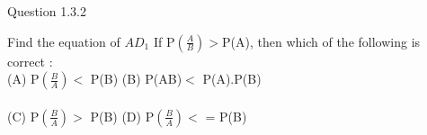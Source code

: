 \documentclass[journal,12pt,twocolumn]{IEEEtran}
\theoremstyle{remark}
\begin{document}
  
  
  
Question 1.3.2  

Find the equation of $AD_1$
If P$(\frac{A}{B})>$P(A), then which of the following is correct :\\
(A) P$(\frac{B}{A})<$ P(B) (B) P(AB)$ <$ P(A).P(B)\\
\\
(C) P$(\frac{B}{A})>$ P(B) (D) P$(\frac{B}{A})<$ = P(B)\\
\end{document}
